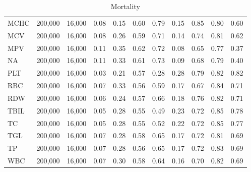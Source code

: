 \begin{table}[ht]
\begin{tabular}{lrrrrrrrrrr}
MCHC & 200,000 & 16,000 & 0.08 & 0.15 & 0.60 & 0.79 & 0.15 & 0.85 & 0.80 & 0.60 \\
MCV & 200,000 & 16,000 & 0.08 & 0.26 & 0.59 & 0.71 & 0.14 & 0.74 & 0.81 & 0.62 \\
MPV & 200,000 & 16,000 & 0.11 & 0.35 & 0.62 & 0.72 & 0.08 & 0.65 & 0.77 & 0.37 \\
NA & 200,000 & 16,000 & 0.11 & 0.33 & 0.61 & 0.73 & 0.09 & 0.68 & 0.79 & 0.40 \\
PLT & 200,000 & 16,000 & 0.03 & 0.21 & 0.57 & 0.28 & 0.28 & 0.79 & 0.82 & 0.82 \\
RBC & 200,000 & 16,000 & 0.07 & 0.33 & 0.56 & 0.59 & 0.17 & 0.67 & 0.84 & 0.71 \\
RDW & 200,000 & 16,000 & 0.06 & 0.24 & 0.57 & 0.66 & 0.18 & 0.76 & 0.82 & 0.71 \\
TBIL & 200,000 & 16,000 & 0.05 & 0.28 & 0.55 & 0.49 & 0.23 & 0.72 & 0.85 & 0.78 \\
TC & 200,000 & 16,000 & 0.05 & 0.28 & 0.55 & 0.52 & 0.22 & 0.72 & 0.85 & 0.77 \\
TGL & 200,000 & 16,000 & 0.07 & 0.28 & 0.58 & 0.65 & 0.17 & 0.72 & 0.81 & 0.69 \\
TP & 200,000 & 16,000 & 0.07 & 0.28 & 0.56 & 0.65 & 0.17 & 0.72 & 0.83 & 0.69 \\
WBC & 200,000 & 16,000 & 0.07 & 0.30 & 0.58 & 0.64 & 0.16 & 0.70 & 0.82 & 0.69 \\
\bottomrule
\end{tabular}
\caption{Mortality}
\end{table}
